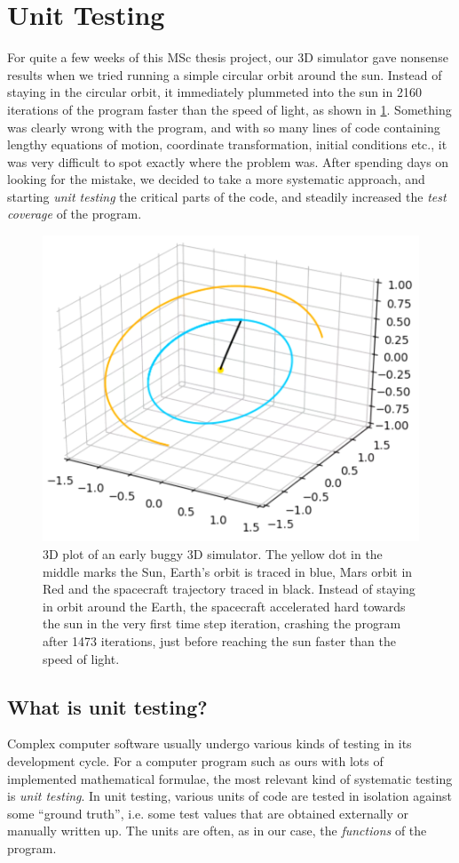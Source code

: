 \section{Unit Testing} \label{sec:unit-testing}
For quite a few weeks of this MSc thesis project, our 3D simulator gave nonsense results when we tried running a simple circular orbit around the sun. Instead of staying in the circular orbit, it immediately plummeted into the sun in 2160 iterations of the program faster than the speed of light, as shown in \cref{fig:r4b-bug}. Something was clearly wrong with the program, and with so many lines of code containing lengthy equations of motion, coordinate transformation, initial conditions etc., it was very difficult to spot exactly where the problem was. After spending days on looking for the mistake, we decided to take a more systematic approach, and starting \emph{unit testing} the critical parts of the code, and steadily increased the \emph{test coverage} of the program.

\begin{figure}[H]
    \centering
    \includegraphics[width=0.50\linewidth]{fig/r4b-bug.png}
    \caption{3D plot of an early buggy 3D simulator. The yellow dot in the middle marks the Sun, Earth's orbit is traced in blue, Mars orbit in Red and the spacecraft trajectory traced in black. Instead of staying in orbit around the Earth, the spacecraft accelerated hard towards the sun in the very first time step iteration, crashing the program after 1473 iterations, just before reaching the sun faster than the speed of light.}
    \label{fig:r4b-bug}
\end{figure}

\subsection{What is unit testing?}
Complex computer software usually undergo various kinds of testing in its development cycle. For a computer program such as ours with lots of implemented mathematical formulae, the most relevant kind of systematic testing is \emph{unit testing}. In unit testing, various units of code are tested in isolation against some ``ground truth'', i.e. some test values that are obtained externally or manually written up. The units are often, as in our case, the \emph{functions} of the program. 

